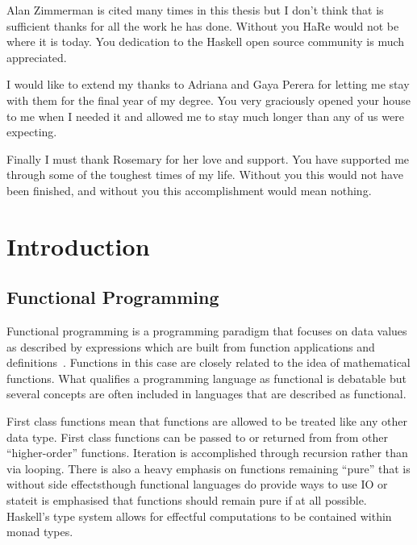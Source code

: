 \begin{preface}
Alan Zimmerman is cited many times in this thesis but I don't think that is sufficient thanks for all the work he has done. Without you HaRe would not be where it is today. You dedication to the Haskell open source community is much appreciated.

I would like to extend my thanks to Adriana and Gaya Perera for letting me stay with them for the final year of my degree. You very graciously opened your house to me when I needed it and allowed me to stay much longer than any of us were expecting.

Finally I must thank Rosemary for her love and support. You have supported me through some of the toughest times of my life. Without you this would not have been finished, and without you this accomplishment would mean nothing.

\end{preface}

\chapter{Introduction}\label{chp:intro}

\DIFaddbegin {}

\DIFaddend \section{Functional Programming}
Functional programming is a programming paradigm that focuses on data values as described by expressions which are built from function applications and definitions~\citep{elementsOfFunc}.  Functions in this case are closely related to the idea of mathematical functions. What qualifies a programming language as functional is debatable but several concepts are often included in languages that are described as functional. 

First class functions mean that functions are allowed to be treated like any other data type. First class functions can be passed to or returned from from other ``higher-order'' functions. Iteration is accomplished through recursion rather than via looping. There is also a heavy emphasis on functions remaining ``pure\DIFaddbegin \DIFadd{,}\DIFaddend '' that is without side effects\DIFdelbegin \DIFdel{, }\DIFdelend \DIFaddbegin \DIFadd{; }\DIFaddend though functional languages do provide ways to use IO or state\DIFaddbegin \DIFadd{, }\DIFaddend it is emphasised that functions should remain pure if at all possible. Haskell's type system allows for effectful computations to be contained within monad types.


